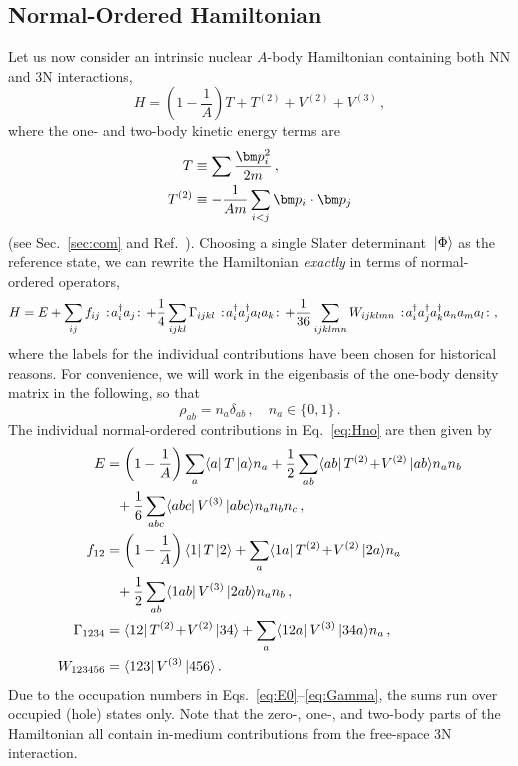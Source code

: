 \subsection{Normal-Ordered Hamiltonian}
Let us now consider an intrinsic nuclear $A$-body Hamiltonian containing both NN and 3N interactions,
\begin{equation}\label{eq:def_Hint}
  H = \left(1-\frac{1}{A}\right)T + T^{(2)} + V^{(2)} +V^{(3)}\,,
\end{equation}
where the one- and two-body kinetic energy terms are
\begin{align}
  T &\equiv \sum\frac{\pOV^2_i}{2m}\,,\\
  T^{(2)} &\equiv -\frac{1}{Am}\sum_{i<j}\pOV_i\cdot\pOV_j
\end{align}
(see Sec.~\ref{sec:com} and Ref.~\cite{Hergert:2009wh}). Choosing a single Slater determinant $\,|{\Phi}\rangle$ as the reference state, we can rewrite the Hamiltonian \emph{exactly} in terms of normal-ordered operators,
\begin{align}\label{eq:Hno}
  \HO &= E + \sum_{ij}f_{ij}\nord{\aaO_{i}\aO_{j}} + \frac{1}{4}\sum_{ijkl}\Gamma_{ijkl}\nord{\aaO_{i}\aaO_{j}\aO_{l}\aO_{k}}
    + \frac{1}{36}\sum_{ijklmn}W_{ijklmn}\nord{\aaO_{i}\aaO_{j}\aaO_{k}\aO_{n}\aO_{m}\aO_{l}}\,,
\end{align}
where the labels for the individual contributions have been chosen for historical reasons. For convenience, we will work in the eigenbasis of the one-body density matrix in the following, so that
\begin{equation}\label{eq:def_natorb}
  \rho_{ab}=n_{a}\delta_{ab}\,,\quad n_{a}\in\{0,1\}\,.
\end{equation}
The individual normal-ordered contributions in Eq.~\eqref{eq:Hno} are then given by
\begin{align}
  E &= \left(1-\frac{1}{A}\right)\sum_{a}\matrixe{a}{T}{a}n_{a}
  		+ \frac{1}{2}\sum_{ab}\matrixe{ab}{T^{(2)}\!+\!V^{(2)}}{ab}n_{a}n_{b}\notag\\
  		&\hphantom{=}+ \frac{1}{6}\sum_{abc}\matrixe{abc}{V^{(3)}}{abc}n_{a}n_{b}n_{c}\,,\label{eq:E0}\\
%
  f_{12} &= \left(1-\frac{1}{A}\right)\matrixe{1}{T}{2} 
  		+ \sum_{a}\matrixe{1a}{T^{(2)}\!+\!V^{(2)}}{2a}n_{a}\notag\\
  		&\hphantom{=}+ \frac{1}{2}\sum_{ab}\matrixe{1ab}{V^{(3)}}{2ab}n_{a}n_{b}\,,\label{eq:f}		\\
  \Gamma_{1234} &= \matrixe{12}{T^{(2)}\!+\!V^{(2)}}{34} + \sum_{a}\matrixe{12a}{V^{(3)}}{34a}n_{a}\,,\label{eq:Gamma}\\
  W_{123456}&=\matrixe{123}{V^{(3)}}{456}\,.
\end{align}
Due to the occupation numbers in Eqs.~\eqref{eq:E0}--\eqref{eq:Gamma}, the sums run over occupied (hole) states only. Note that the zero-, one-, and two-body parts of the Hamiltonian all contain in-medium contributions from the free-space 3N interaction. 

